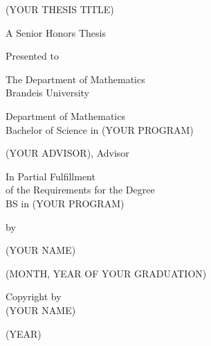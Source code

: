 \documentclass{article}
\begin{document}
\begin{titlepage}
   \begin{center}
       \vspace*{1cm}
       
       (YOUR THESIS TITLE)
       
       \vspace{0.5cm}
       
       A Senior Honors Thesis
       
       \vspace{0.5cm}
       
       Presented to
       
       \vspace{0.5cm}
       
       The Department of Mathematics\\
       Brandeis University
       
       \vspace{0.5cm}
       
       Department of Mathematics\\
       Bachelor of Science in (YOUR PROGRAM)
       
       \vspace{0.5cm}
       
       (YOUR ADVISOR), Advisor
       
       \vspace{0.5cm}
       
       In Partial Fulfillment\\
       of the Requirements for the Degree\\
       BS in (YOUR PROGRAM)
       
       \vspace{0.5cm}
       
       by
       
       \vspace{0.5cm}
       
       (YOUR NAME)
       
       \vspace{0.5cm}
       
       (MONTH, YEAR OF YOUR GRADUATION)
 
   \end{center}
\end{titlepage}
\thispagestyle{empty}
\vspace*{\fill}
\begin{center}
    Copyright by\\
    (YOUR NAME)
    
    \vspace{0.5cm}
    
    (YEAR)
\end{center}
\end{document}
